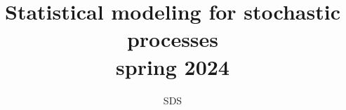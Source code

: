 \documentclass{article}
\begin{document}
\title{Statistical modeling for stochastic processes\\ spring 2024}
\author{SDS}
\date{}
\maketitle
\tableofcontents




\end{document}
